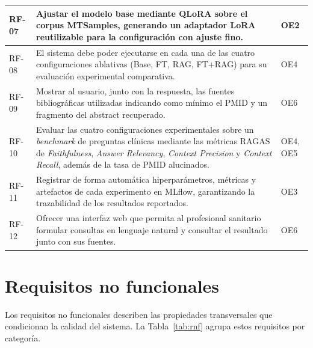 \documentclass[11pt,a4paper,spanish]{book}
\numberwithin{equation}{chapter}
\numberwithin{figure}{chapter}
\begin{document}
{\begin{longtable}{|p{}|p{}|p{}|}
\hline
RF-07 & Ajustar el modelo base mediante QLoRA sobre el corpus MTSamples, generando un adaptador LoRA reutilizable para la configuración con ajuste fino. & OE2 \\
\hline
RF-08 & El sistema debe poder ejecutarse en cada una de las cuatro configuraciones ablativas (Base, FT, RAG, FT+RAG) para su evaluación experimental comparativa. & OE4 \\
\hline
RF-09 & Mostrar al usuario, junto con la respuesta, las fuentes bibliográficas utilizadas indicando como mínimo el PMID y un fragmento del abstract recuperado. & OE6 \\
\hline
RF-10 & Evaluar las cuatro configuraciones experimentales sobre un \textit{benchmark} de preguntas clínicas mediante las métricas RAGAS de \textit{Faithfulness}, \textit{Answer Relevancy}, \textit{Context Precision} y \textit{Context Recall}, además de la tasa de PMID alucinados. & OE4, OE5 \\
\hline
RF-11 & Registrar de forma automática hiperparámetros, métricas y artefactos de cada experimento en MLflow, garantizando la trazabilidad de los resultados reportados. & OE3 \\
\hline
RF-12 & Ofrecer una interfaz web que permita al profesional sanitario formular consultas en lenguaje natural y consultar el resultado junto con sus fuentes. & OE6 \\
\hline
\end{longtable}
}

\section{Requisitos no funcionales}

Los requisitos no funcionales describen las propiedades transversales que condicionan la calidad del sistema. La Tabla~\ref{tab:rnf} agrupa estos requisitos por categoría.
\end{document}
